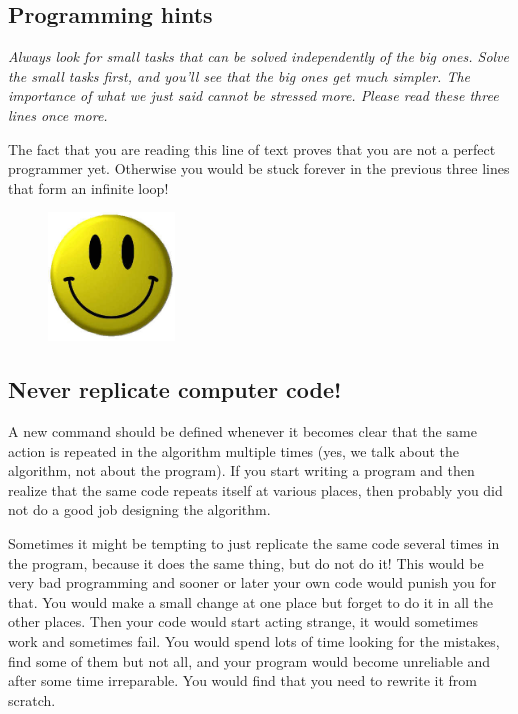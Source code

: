 \subsection{Programming hints}

{\em Always look for small tasks that can be solved independently of the big ones.
Solve the small tasks first, and you'll see that the big ones get much simpler. The 
importance of what we just said cannot be stressed more. Please read these three 
lines once more.}

\noindent
The fact that you are reading this line of text proves that you are not 
a perfect programmer yet. Otherwise you would be stuck forever in the 
previous three lines that form an infinite loop!

\begin{figure}[!ht]
\begin{center}
\includegraphics[width=0.3\textwidth]{imgk/smiley.png}
\end{center}
\vspace{-1cm}
\end{figure}

\subsection{Never replicate computer code!}

A new command should be defined whenever it becomes clear that the same 
action is repeated in the algorithm multiple times (yes, we talk about the algorithm,
not about the program). If you start writing a program and then realize that the same
code repeats itself at various places, then probably you did not do a good job 
designing the algorithm.

Sometimes it might be 
tempting to just replicate the same code several times in the 
program, because it does the same thing, but do not do it! This would be very bad programming
and sooner or later your own code would punish you for that. 
You would make a small change at one place but forget to do it 
in all the other places. Then your code would start 
acting strange, it would sometimes work and sometimes fail. 
You would spend lots of time looking for the mistakes, find some 
of them but not all, and your program would become unreliable
and after some time irreparable. You would find that you need to 
rewrite it from scratch.

